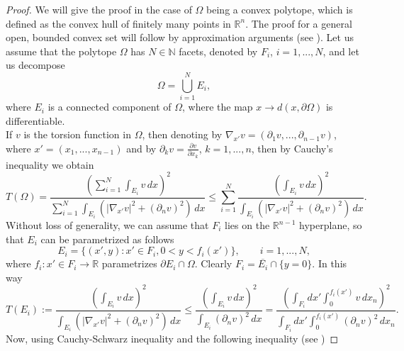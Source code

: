 \documentclass[oneside,a4paper,11pt,notitlepage]{article}
\newcommand{\abs}[1]{{\left|#1\right|}}
\theoremstyle{definition}
\theoremstyle{plain}
\theoremstyle{definition}
\begin{document}
\begin{proof}
   We will give the proof in the case of $\Omega$ being a convex polytope, which is defined as the convex hull of finitely many points in $\mathbb R^n$. The proof for a general open, bounded convex set will follow by approximation arguments (see \cite[Theorem $1.8.16$]{schneider}). Let us assume that the polytope $\Omega$ has $N\in\mathbb N$ facets, denoted by $F_i$, $i=1,..., N$, and let us decompose
   \begin{equation*}
      \Omega= \bigcup_{i=1}^N E_i,%
   \end{equation*}
   where $E_i$ is a connected component of $\Omega$, where the map $x\to d(x,\partial\Omega)$ is differentiable.\\
   If $v$ is the torsion function in $\Omega$, then denoting by $\nabla_{x'}v= (\partial_1v,...,\partial_{n-1}v)$, where  $x'=(x_1,...,x_{n-1})$ and by $\partial_kv= \frac{\partial v}{\partial x_k}$, $k=1,...,n$, then by Cauchy's inequality we obtain
   \begin{equation*}
       T(\Omega) =\frac{\left(\displaystyle{\sum_{i=1}^N\int_{E_i} v \, dx }\right)^2}{\displaystyle{\sum_{i=1}^N\int_{E_i}(\abs{\nabla_{x'} v}^2+(\partial_nv)^2) \, dx }}\le \sum_{i=1}^N\frac{\displaystyle{\left(\int_{E_i} v \, dx \right)^2}}{\displaystyle{\int_{E_i}(\abs{\nabla_{x'} v}^2+(\partial_nv)^2) \, dx }}.
   \end{equation*}
   Without loss of generality, we can assume that $F_i$ lies on the $\mathbb R^{n-1}$ hyperplane, so that $E_i$ can be parametrized as follows
   \begin{equation*}
       E_i = \{(x',y): x'\in F_i, 0<y<f_i(x')\},\qquad i=1,...,N,
   \end{equation*}
   where $f_i:x'\in F_i\to \mathbb R$ parametrizes $\partial E_i \cap \Omega$. Clearly $F_i = \overline{E_i} \cap \{y=0\}$. In this way
   \begin{equation*}
       T(E_i) := \frac{\displaystyle{\left(\int_{E_i} v \, dx \right)^2}}{\displaystyle{\int_{E_i}(\abs{\nabla_{x'} v}^2+(\partial_nv)^2) \, dx }}\le \frac{\displaystyle{\left(\int_{E_i} v \, dx \right)^2}}{\displaystyle{\int_{E_i}(\partial_nv)^2 \, dx }}=\frac{\displaystyle{\left(\int_{F_i}dx'\int_0^{f_i(x')} v \, dx_n \right)^2}}{\displaystyle{\int_{F_i}dx'\int_0^{f_i(x')}(\partial_nv)^2 \, dx_n }}. 
   \end{equation*}
   Now, using Cauchy-Schwarz inequality and the following inequality (see \cite[equation $(7)$]{makai})

\end{proof}
\end{document}

